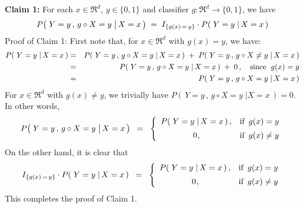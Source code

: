 \vskip 0.2cm
\noindent
\textbf{Claim 1:}\quad
For each $x \in \Re^{d}$, $y \in \{0,1\}$ and classifier $g : \Re^{d} \longrightarrow \{0,1\}$, we have
\begin{equation*}
P\!\left(\,\left. Y = y \,,\, \overset{{\color{white}.}}{g} \circ X = y \;\right\vert X = x \,\right)
\;=\;
I_{\{g(x)\,=\,y\}} \cdot P\!\left(\,\left. Y = y \;\right\vert X = x \,\right)
\end{equation*}
Proof of Claim 1:\;
First note that, for $x \in \Re^{d}$ with $g(x) = y$, we have:
\begin{eqnarray*}
P\!\left(\,\left. Y = y \;\right\vert X = x \,\right)
& = &
	P\!\left(\,\left. Y = y\,,\, g \circ X = y \;\right\vert X = x \,\right)
	\; + \;
	P\!\left(\,\left. Y = y\,,\, g \circ X \neq y \;\right\vert X = x \,\right)
\\
& = &
	P\!\left(\,\left. Y = y\,,\, g \circ X = y \;\right\vert X = x \,\right)
	\; + \;
	0\,,
	\quad
	\textnormal{since \;$g(x) = y$}
\\
& = &
	P\!\left(\,\left. Y = y\,,\, g \circ X = y \;\right\vert X = x \,\right)
\end{eqnarray*}
For $x \in \Re^{d}$ with $g(x) \neq y$, we trivially have
$P\!\left(\,\left. Y = y\,,\, g \circ X = y \;\right\vert X = x \,\right) = 0$.
In other words,
\begin{equation*}
P\!\left(\,\left. Y = y \,,\, \overset{{\color{white}.}}{g} \circ X = y \;\right\vert X = x \,\right)
\;\; = \;\;
	\left\{\begin{array}{cl}
	P\!\left(\,\left. Y = y \;\right\vert X = x \,\right), & \textnormal{if \,$g(x) = y$}
	\\
	\overset{{\color{white}-}}{0}, & \textnormal{if \,$g(x) \neq y$}
	\end{array}\right.
\end{equation*}
On the other hand, it is clear that
\begin{equation*}
I_{\{g(x)\,=\,y\}} \cdot P\!\left(\,\left. Y = y \;\right\vert X = x \,\right)
\;\; = \;\;
	\left\{\begin{array}{cl}
	P\!\left(\,\left. Y = y \;\right\vert X = x \,\right), & \textnormal{if \,$g(x) = y$}
	\\
	\overset{{\color{white}-}}{0}, & \textnormal{if \,$g(x) \neq y$}
	\end{array}\right.
\end{equation*}
This completes the proof of Claim 1.


